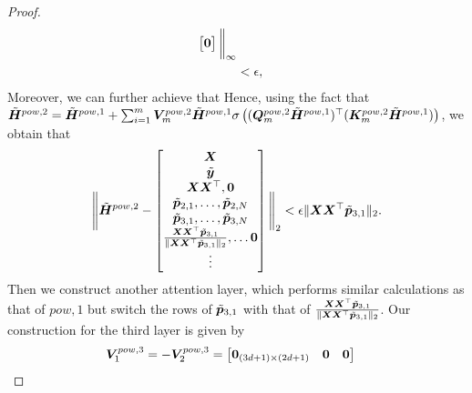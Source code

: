 \begin{proof}
\begin{align*}
\begin{bmatrix}
            \boldsymbol{0}
        \end{bmatrix}\bigg\Vert_{\infty}\\
        &<\epsilon,
    \end{align*}
    Moreover, we can further achieve that
    Hence, using the fact that $\tilde{\boldsymbol{H}}^{pow,2}=\tilde{\boldsymbol{H}}^{pow,1}+\sum_{i=1}^m\boldsymbol{V}_m^{pow,2}\tilde{\boldsymbol{H}}^{pow,1}\sigma\left((\boldsymbol{Q}_m^{pow,2}\tilde{\boldsymbol{H}}^{pow,1})^\top(\boldsymbol{K}_m^{pow,2}\tilde{\boldsymbol{H}}^{pow,1})\right)$, we obtain that
    \begin{align*}
        \Bigg\Vert\tilde{\boldsymbol{H}}^{pow,2}-\begin{bmatrix}
            \boldsymbol{X}\\
            \tilde{\boldsymbol{y}}\\
            \boldsymbol{X}\boldsymbol{X}^\top,\boldsymbol{0}\\
            \tilde{\boldsymbol{p}}_{2,1},\ldots,\tilde{\boldsymbol{p}}_{2,N}\\
            \tilde{\boldsymbol{p}}_{3,1},\ldots,\tilde{\boldsymbol{p}}_{3,N}\\
            \frac{\boldsymbol{X}\boldsymbol{X}^\top\tilde{\boldsymbol{p}}_{3,1}}{\Vert\boldsymbol{X}\boldsymbol{X}^\top\tilde{\boldsymbol{p}}_{3,1}\Vert_2},\ldots\boldsymbol{0}\\
            \vdots
        \end{bmatrix}\Bigg\Vert_{2}<\epsilon\Vert\boldsymbol{X}\boldsymbol{X}^\top\tilde{\boldsymbol{p}}_{3,1}\Vert_2.
    \end{align*}
    Then we construct another attention layer, which performs similar calculations as that of $pow,1$ but switch the rows of $\tilde{\boldsymbol{p}}_{3,1}$ with that of $\frac{\boldsymbol{X}\boldsymbol{X}^\top\tilde{\boldsymbol{p}}_{3,1}}{\Vert\boldsymbol{X}\boldsymbol{X}^\top\tilde{\boldsymbol{p}}_{3,1}\Vert_2}$. Our construction for the third layer is given by
    \begin{align*}
        \boldsymbol{V}_{1}^{pow,3}&=-\boldsymbol{V}_{2}^{pow,3}=\begin{bmatrix}
            \boldsymbol{0}_{(3d+1)\times (2d+1)}&\boldsymbol{0}&\boldsymbol{0}\\

\end{bmatrix}
\end{align*}
\end{proof}
